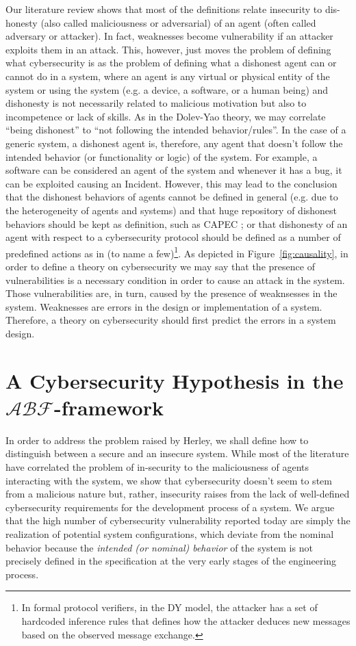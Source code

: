 \documentclass[conference]{IEEEtran}
\newcommand{\assertionRegion}{\mathcal{A}}
\newcommand{\beliefRegion}{\mathcal{B}}
\newcommand{\factRegion}{\mathcal{F}}
\newcommand{\abftheory}{\assertionRegion\beliefRegion\factRegion}
\begin{document}
Our literature review shows that most of the definitions relate insecurity to
dis-honesty (also called maliciousness or adversarial) of an agent (often
called adversary or attacker). In fact, weaknesses become vulnerability if an
attacker exploits them in an attack.  This, however, just moves the problem of
defining what cybersecurity is as the problem of defining what a dishonest
agent can or cannot do in a system, where an agent is any virtual or physical
entity of the system or using the system (e.g. a device, a software, or a human
being) and dishonesty is not necessarily related to malicious motivation but
also to incompetence or lack of skills. As in the Dolev-Yao theory, we may
correlate ``being dishonest'' to ``not following the intended behavior/rules''.
In the case of a generic system, a dishonest agent is, therefore, any agent
that doesn't follow the intended behavior (or functionality or logic) of the
system.  For example, a software can be considered an agent of the system and
whenever it has a bug, it can be exploited causing an Incident. However, this
may lead to the conclusion that the dishonest behaviors of agents cannot be
defined in general (e.g. due to the heterogeneity of agents and systems) and
that huge repository of dishonest behaviors should be kept as definition, such
as CAPEC \autocite{MITRE2020CAPEC}; or that dishonesty of an agent with respect
to a cybersecurity protocol should be defined as a number of predefined actions as
in
\autocite{Turuani2006clatse,Basin2005ofmc,Armando2016satmc,Rocchetto2017interpolation}
(to name a few)\footnote{In formal protocol verifiers, in the DY model, the
attacker has a set of hardcoded inference rules that defines how the attacker
deduces new messages based on the observed message exchange.}.  As depicted in
Figure~\ref{fig:causality}, in order to define a theory on cybersecurity we may
say that the presence of vulnerabilities is a necessary condition in order to
cause an attack in the system.  Those vulnerabilities are, in turn, caused by
the presence of weaknsesses in the system.  Weaknesses are errors in the design
or implementation of a system.  Therefore, a theory on cybersecurity should
first predict the errors in a system design.

\section{A Cybersecurity Hypothesis in the $\abftheory$-framework}\label{sec:hypothesis}
In order to address the problem raised by Herley, we shall define how to
distinguish between a secure and an insecure system. While most of the
literature have correlated the problem of in-security
to the maliciousness of agents interacting with the system, we show that
cybersecurity doesn't seem to stem from a malicious nature but, rather, insecurity
raises from the lack of well-defined cybersecurity requirements for the development
process of a system. We argue that the high number of cybersecurity vulnerability
reported today are simply the realization of potential system configurations,
which deviate from the nominal behavior because the \emph{intended (or
nominal) behavior} of the system is not precisely defined in the specification
at the very early stages of the engineering process.
\end{document}
